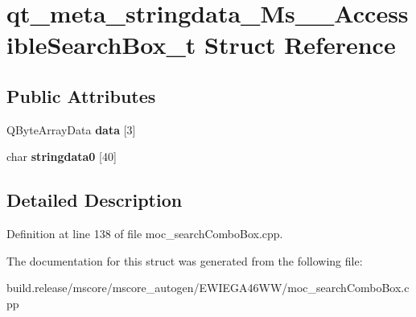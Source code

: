 \hypertarget{structqt__meta__stringdata___ms_____accessible_search_box__t}{}\section{qt\+\_\+meta\+\_\+stringdata\+\_\+\+Ms\+\_\+\+\_\+\+Accessible\+Search\+Box\+\_\+t Struct Reference}
\label{structqt__meta__stringdata___ms_____accessible_search_box__t}
\subsection*{Public Attributes}
\begin{DoxyCompactItemize}
\item 
\mbox{\label{structqt__meta__stringdata___ms_____accessible_search_box__t_a1d09e30300a575e69fdedccf6443a6d8}} 
Q\+Byte\+Array\+Data {\bfseries data} \mbox{[}3\mbox{]}
\item 
\mbox{\label{structqt__meta__stringdata___ms_____accessible_search_box__t_a380bf5be9fa6b2e3bb3e11e295035348}} 
char {\bfseries stringdata0} \mbox{[}40\mbox{]}
\end{DoxyCompactItemize}


\subsection{Detailed Description}


Definition at line 138 of file moc\+\_\+search\+Combo\+Box.\+cpp.



The documentation for this struct was generated from the following file\+:\begin{DoxyCompactItemize}
\item 
build.\+release/mscore/mscore\+\_\+autogen/\+E\+W\+I\+E\+G\+A46\+W\+W/moc\+\_\+search\+Combo\+Box.\+cpp\end{DoxyCompactItemize}
